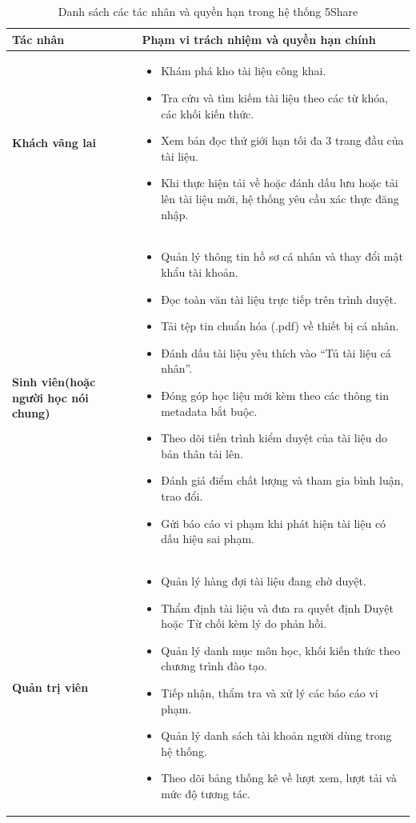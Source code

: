 \begin{table}[H]
\centering
\small
\renewcommand{\arraystretch}{1.25}
\begin{tabularx}{\textwidth}{|p{3.8cm}|X|}
\hline
\rowcolor[HTML]{EAEAEA}
\textbf{Tác nhân} & \textbf{Phạm vi trách nhiệm và quyền hạn chính} \\
\hline
\textbf{Khách vãng lai} & 
\begin{itemize}[leftmargin=*,nosep]
    \item Khám phá kho tài liệu công khai.
    \item Tra cứu và tìm kiếm tài liệu theo các từ khóa, các khối kiến thức.
    \item Xem bản đọc thử giới hạn tối đa 3 trang đầu của tài liệu.
    \item Khi thực hiện tải về hoặc đánh dấu lưu hoặc tải lên tài liệu mới, hệ thống yêu cầu xác thực đăng nhập.
\end{itemize} \\
\hline
\textbf{Sinh viên\newline (hoặc người học nói chung)} & 
\begin{itemize}[leftmargin=*,nosep]
    \item Quản lý thông tin hồ sơ cá nhân và thay đổi mật khẩu tài khoản.
    \item Đọc toàn văn tài liệu trực tiếp trên trình duyệt.
    \item Tải tệp tin chuẩn hóa (.pdf) về thiết bị cá nhân.
    \item Đánh dấu tài liệu yêu thích vào ``Tủ tài liệu cá nhân''.
    \item Đóng góp học liệu mới kèm theo các thông tin metadata bắt buộc.
    \item Theo dõi tiến trình kiểm duyệt của tài liệu do bản thân tải lên.
    \item Đánh giá điểm chất lượng và tham gia bình luận, trao đổi.
    \item Gửi báo cáo vi phạm khi phát hiện tài liệu có dấu hiệu sai phạm.
\end{itemize} \\
\hline
\textbf{Quản trị viên} & 
\begin{itemize}[leftmargin=*,nosep]
    \item Quản lý hàng đợi tài liệu đang chờ duyệt.
    \item Thẩm định tài liệu và đưa ra quyết định Duyệt hoặc Từ chối kèm lý do phản hồi.
    \item Quản lý danh mục môn học, khối kiến thức theo chương trình đào tạo.
    \item Tiếp nhận, thẩm tra và xử lý các báo cáo vi phạm.
    \item Quản lý danh sách tài khoản người dùng trong hệ thống.
    \item Theo dõi bảng thống kê về lượt xem, lượt tải và mức độ tương tác.
\end{itemize} \\
\hline
\end{tabularx}
\caption{Danh sách các tác nhân và quyền hạn trong hệ thống 5Share}
\label{tab:tac_nhan_5share}
\end{table}

